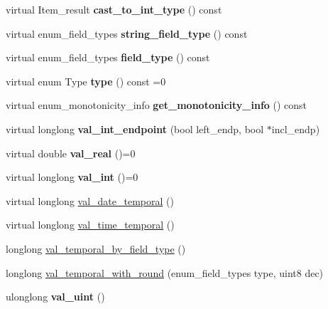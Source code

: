 \begin{DoxyCompactItemize}
virtual Item\+\_\+result {\bfseries cast\+\_\+to\+\_\+int\+\_\+type} () const
\item 
\mbox{\label{classItem_ad32a8145ed931606f51ee55493077585}} 
virtual enum\+\_\+field\+\_\+types {\bfseries string\+\_\+field\+\_\+type} () const
\item 
\mbox{\label{classItem_a3f6be9b1d4e2a0b7190e0b9a90c0c6a9}} 
virtual enum\+\_\+field\+\_\+types {\bfseries field\+\_\+type} () const
\item 
\mbox{\label{classItem_aee8b1ec6739e79398968253a17a300eb}} 
virtual enum Type {\bfseries type} () const =0
\item 
\mbox{\label{classItem_ae4fd66e4b8748adf4953b9f92ee5c92d}} 
virtual enum\+\_\+monotonicity\+\_\+info {\bfseries get\+\_\+monotonicity\+\_\+info} () const
\item 
\mbox{\label{classItem_aee6ad13fd4a6cbecf438e0550021590f}} 
virtual longlong {\bfseries val\+\_\+int\+\_\+endpoint} (bool left\+\_\+endp, bool $\ast$incl\+\_\+endp)
\item 
\mbox{\label{classItem_a00ccd18c535f46512dd52c016e767f71}} 
virtual double {\bfseries val\+\_\+real} ()=0
\item 
\mbox{\label{classItem_a582158d8691b5f0f799ccaa4d3d69045}} 
virtual longlong {\bfseries val\+\_\+int} ()=0
\item 
virtual longlong \mbox{\hyperlink{classItem_a9174217a46706eb2db74689b5365c4a5}{val\+\_\+date\+\_\+temporal}} ()
\item 
virtual longlong \mbox{\hyperlink{classItem_a69ef60a3917a1bb4832498a695754c58}{val\+\_\+time\+\_\+temporal}} ()
\item 
longlong \mbox{\hyperlink{classItem_a00ab36bcf5ebe7138e869d1ceecee573}{val\+\_\+temporal\+\_\+by\+\_\+field\+\_\+type}} ()
\item 
longlong \mbox{\hyperlink{classItem_a934c293f50afd4e39891b26beef3e3c4}{val\+\_\+temporal\+\_\+with\+\_\+round}} (enum\+\_\+field\+\_\+types type, uint8 dec)
\item 
\mbox{\label{classItem_a0a955fa3645b23c8074701e33eabe06e}} 
ulonglong {\bfseries val\+\_\+uint} ()

\end{DoxyCompactItemize}
